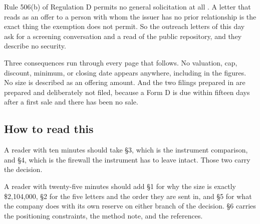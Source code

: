 Rule 506(b) of Regulation D permits no general solicitation at all
\cite{secformd2026}. A letter that reads as an offer to a person with whom the
issuer has no prior relationship is the exact thing the exemption does not
permit. So the outreach letters of this day ask for a screening conversation and
a read of the public repository, and they describe no security.

Three consequences run through every page that follows. No valuation, cap,
discount, minimum, or closing date appears anywhere, including in the figures. No
size is described as an offering amount. And the two filings prepared in
 are prepared and deliberately not
filed, because a Form D is due within fifteen days after a first sale and there
has been no sale.

\subsection{How to read this}

A reader with ten minutes should take \S3, which is the instrument comparison,
and \S4, which is the firewall the instrument has to leave intact. Those two
carry the decision.

A reader with twenty-five minutes should add \S1 for why the size is exactly
\$2,104,000, \S2 for the five letters and the order they are sent in, and \S5 for
what the company does with its own reserve on either branch of the decision. \S6
carries the positioning constraints, the method note, and the references.
